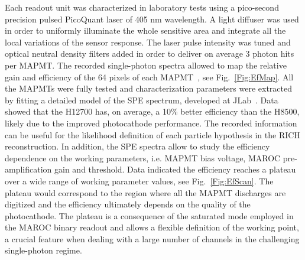 \documentclass[final,5p,times,twocolumn]{elsarticle}
\begin{document}
Each readout unit was characterized in laboratory tests using a pico-second precision pulsed PicoQuant laser of 
405 nm wavelength. A light diffuser was used in order to uniformly illuminate the whole sensitive area and integrate all
the local variations of the sensor response. The laser pulse intensity was tuned and optical neutral density filters added 
in order to deliver on average 3 photon hits per MAPMT. The recorded single-photon spectra allowed
to map the relative gain and efficiency of the 64 pixels of each MAPMT~\cite{MAPMT:laser}, see Fig.~\ref{Fig:EfMap}. 
All the MAPMTs were fully tested 
and characterization parameters were extracted by fitting a detailed model of the SPE spectrum,
developed at JLab~\cite{MAPMT:model}.
Data showed that the H12700 has, on average, a 10\% better efficiency than the H8500, 
likely due to the improved photocathode performance. 
The recorded information
can be useful for the likelihood definition of each particle hypothesis in the RICH reconstruction. 
In addition, the SPE spectra allow to study the efficiency dependence on the working parameters, i.e. MAPMT bias voltage, 
MAROC pre-amplification gain and threshold. Data indicated the efficiency reaches a plateau over a wide range of 
working parameter values, see Fig.~\ref{Fig:EfScan}. The plateau would correspond to the region where all the MAPMT discharges 
are digitized and the efficiency ultimately depends on the quality of the photocathode. The plateau is a consequence
of the saturated mode employed in the MAROC binary readout and allows a flexible definition of the working point,
a crucial feature when dealing with a large number of channels in the challenging single-photon regime.


\end{document}
